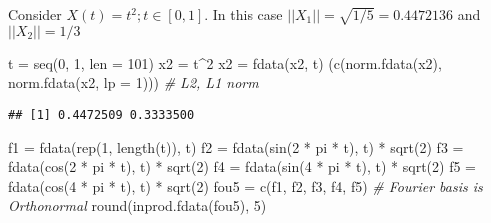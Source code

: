\documentclass[
]{book}
\newenvironment{Shaded}{\begin{snugshade}}{\end{snugshade}}
\newcommand{\AttributeTok}[1]{\textcolor[rgb]{0.77,0.63,0.00}{#1}}
\newcommand{\CommentTok}[1]{\textcolor[rgb]{0.56,0.35,0.01}{\textit{#1}}}
\newcommand{\DecValTok}[1]{\textcolor[rgb]{0.00,0.00,0.81}{#1}}
\newcommand{\FunctionTok}[1]{\textcolor[rgb]{0.00,0.00,0.00}{#1}}
\newcommand{\NormalTok}[1]{#1}
\newcommand{\OtherTok}[1]{\textcolor[rgb]{0.56,0.35,0.01}{#1}}
\newcommand{\SpecialCharTok}[1]{\textcolor[rgb]{0.00,0.00,0.00}{#1}}
\begin{document}
Consider \(X(t) = t^2; t\in[0, 1]\). In this case \(||X_1|| =\sqrt{1/5}=0.4472136\) and \(||X_2|| =1/3\)

\begin{Shaded}
\begin{Highlighting}[]
\NormalTok{t }\OtherTok{=} \FunctionTok{seq}\NormalTok{(}\DecValTok{0}\NormalTok{, }\DecValTok{1}\NormalTok{, }\AttributeTok{len =} \DecValTok{101}\NormalTok{)}
\NormalTok{x2 }\OtherTok{=}\NormalTok{ t}\SpecialCharTok{\^{}}\DecValTok{2}
\NormalTok{x2 }\OtherTok{=} \FunctionTok{fdata}\NormalTok{(x2, t)}
\NormalTok{(}\FunctionTok{c}\NormalTok{(}\FunctionTok{norm.fdata}\NormalTok{(x2), }\FunctionTok{norm.fdata}\NormalTok{(x2, }\AttributeTok{lp =} \DecValTok{1}\NormalTok{))) }\CommentTok{\# L2, L1 norm}
\end{Highlighting}
\end{Shaded}

\begin{verbatim}
## [1] 0.4472509 0.3333500
\end{verbatim}

\begin{Shaded}
\begin{Highlighting}[]
\NormalTok{f1 }\OtherTok{=} \FunctionTok{fdata}\NormalTok{(}\FunctionTok{rep}\NormalTok{(}\DecValTok{1}\NormalTok{, }\FunctionTok{length}\NormalTok{(t)), t)}
\NormalTok{f2 }\OtherTok{=} \FunctionTok{fdata}\NormalTok{(}\FunctionTok{sin}\NormalTok{(}\DecValTok{2} \SpecialCharTok{*}\NormalTok{ pi }\SpecialCharTok{*}\NormalTok{ t), t) }\SpecialCharTok{*} \FunctionTok{sqrt}\NormalTok{(}\DecValTok{2}\NormalTok{)}
\NormalTok{f3 }\OtherTok{=} \FunctionTok{fdata}\NormalTok{(}\FunctionTok{cos}\NormalTok{(}\DecValTok{2} \SpecialCharTok{*}\NormalTok{ pi }\SpecialCharTok{*}\NormalTok{ t), t) }\SpecialCharTok{*} \FunctionTok{sqrt}\NormalTok{(}\DecValTok{2}\NormalTok{)}
\NormalTok{f4 }\OtherTok{=} \FunctionTok{fdata}\NormalTok{(}\FunctionTok{sin}\NormalTok{(}\DecValTok{4} \SpecialCharTok{*}\NormalTok{ pi }\SpecialCharTok{*}\NormalTok{ t), t) }\SpecialCharTok{*} \FunctionTok{sqrt}\NormalTok{(}\DecValTok{2}\NormalTok{)}
\NormalTok{f5 }\OtherTok{=} \FunctionTok{fdata}\NormalTok{(}\FunctionTok{cos}\NormalTok{(}\DecValTok{4} \SpecialCharTok{*}\NormalTok{ pi }\SpecialCharTok{*}\NormalTok{ t), t) }\SpecialCharTok{*} \FunctionTok{sqrt}\NormalTok{(}\DecValTok{2}\NormalTok{)}
\NormalTok{fou5 }\OtherTok{=} \FunctionTok{c}\NormalTok{(f1, f2, f3, f4, f5) }\CommentTok{\# Fourier basis is Orthonormal}
\FunctionTok{round}\NormalTok{(}\FunctionTok{inprod.fdata}\NormalTok{(fou5), }\DecValTok{5}\NormalTok{)}
\end{Highlighting}
\end{Shaded}
\end{document}
